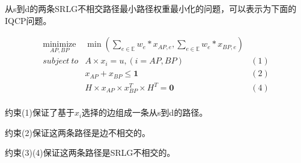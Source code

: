 从s到d的两条SRLG不相交路径最小路径权重最小化的问题，可以表示为下面的IQCP问题。

\begin{equation*}
\begin{array}{*{20}{c}}
   {\mathop {minimize}\limits_{AP,BP} } & {\min \left( {{\sum\limits_{e\in \mathbb{E}}w_e*x_{AP,e}},{\sum\limits_{e\in \mathbb{E}}w_e*x_{BP,e}}} \right)}  \\
   {subject\ to} & A\times x_i=u,(i=AP,BP)& (1) \\
   {} & x_{AP}+x_{BP}\leq \textbf{1}& (2)\\
   {} & H\times x_{AP}\times x_{BP}^T\times H^T = \textbf{0}& (4)\\
\end{array}
\label{eq:problem definition}
\end{equation*}

约束(1)保证了基于$x_i$选择的边组成一条从s到d的路径。

约束(2)保证这两条路径是边不相交的。

约束(3)(4)保证这两条路径是SRLG不相交的。

